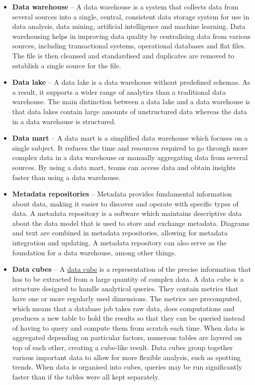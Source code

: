 \documentclass[
]{book}
\begin{document}
\begin{itemize}
\item
  \textbf{Data warehouse} -- A data warehouse is a system that collects data from several sources into a single, central, consistent data storage system for use in data analysis, data mining, artificial intelligence and machine learning. Data warehousing helps in improving data quality by centralising data from various sources, including transactional systems, operational databases and flat files. The file is then cleansed and standardised and duplicates are removed to establish a single source for the file.
\item
  \textbf{Data lake} -- A data lake is a data warehouse without predefined schemas. As a result, it supports a wider range of analytics than a traditional data warehouse. The main distinction between a data lake and a data warehouse is that data lakes contain large amounts of unstructured data whereas the data in a data warehouse is structured.
\item
  \textbf{Data mart} -- A data mart is a simplified data warehouse which focuses on a single subject. It reduces the time and resources required to go through more complex data in a data warehouse or manually aggregating data from several sources. By using a data mart, teams can access data and obtain insights faster than using a data warehouse.
\item
  \textbf{Metadata repositories} -- Metadata provides fundamental information about data, making it easier to discover and operate with specific types of data. A metadata repository is a software which maintains descriptive data about the data model that is used to store and exchange metadata. Diagrams and text are combined in metadata repositories, allowing for metadata integration and updating. A metadata repository can also serve as the foundation for a data warehouse, among other things.
\item
  \textbf{Data cubes} -- A \href{https://www.metabase.com/learn/databases/data-cube}{data cube} is a representation of the precise information that has to be extracted from a large quantity of complex data. A data cube is a structure designed to handle analytical queries. They contain metrics that have one or more regularly used dimensions. The metrics are precomputed, which means that a database job takes raw data, does computations and produces a new table to hold the results so that they can be queried instead of having to query and compute them from scratch each time. When data is aggregated depending on particular factors, numerous tables are layered on top of each other, creating a cube-like result. Data cubes group together various important data to allow for more flexible analysis, such as spotting trends. When data is organised into cubes, queries may be run significantly faster than if the tables were all kept separately.

\end{itemize}
\end{document}

